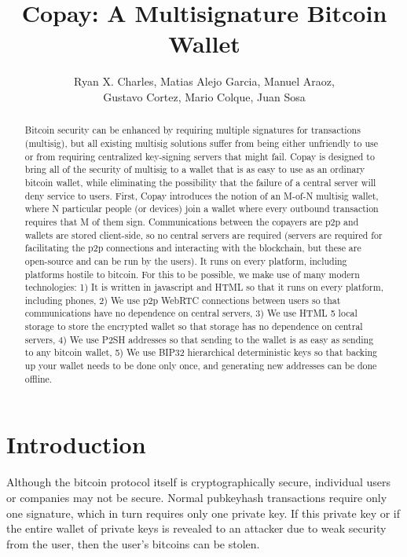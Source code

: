 \documentclass{article}
\begin{document}
\pagestyle{headings}
\title{Copay: A Multisignature Bitcoin Wallet}
\author{
Ryan X. Charles,
Matias Alejo Garcia,
Manuel Araoz,\\
Gustavo Cortez,
Mario Colque,
Juan Sosa
}
\date{}
\maketitle
\begin{abstract}
Bitcoin security can be enhanced by requiring multiple signatures for transactions (multisig), but all existing multisig solutions suffer from being either unfriendly to use or from requiring centralized key-signing servers that might fail.
Copay is designed to bring all of the security of multisig to a wallet that is as easy to use as an ordinary bitcoin wallet, while eliminating the possibility that the failure of a central server will deny service to users.
First, Copay introduces the notion of an M-of-N multisig wallet, where N particular people (or devices) join a wallet where every outbound transaction requires that M of them sign.
Communications between the copayers are p2p and wallets are stored client-side, so no central servers are required (servers are required for facilitating the p2p connections and interacting with the blockchain, but these are open-source and can be run by the users).
It runs on every platform, including platforms hostile to bitcoin.
For this to be possible, we make use of many modern technologies:
1) It is written in javascript and HTML so that it runs on every platform, including phones,
2) We use p2p WebRTC connections between users so that communications have no dependence on central servers,
3) We use HTML 5 local storage to store the encrypted wallet so that storage has no dependence on central servers,
4) We use P2SH addresses so that sending to the wallet is as easy as sending to any bitcoin wallet,
5) We use BIP32 hierarchical deterministic keys so that backing up your wallet needs to be done only once, and generating new addresses can be done offline.
\end{abstract}

\section{Introduction}

Although the bitcoin protocol itself is cryptographically secure, individual users or companies may not be secure.
Normal pubkeyhash transactions \cite{bwpkh} require only one signature, which in turn requires only one private key.
If this private key or if the entire wallet of private keys is revealed to an attacker due to weak security from the user, then the user's bitcoins can be stolen.
\end{document}
